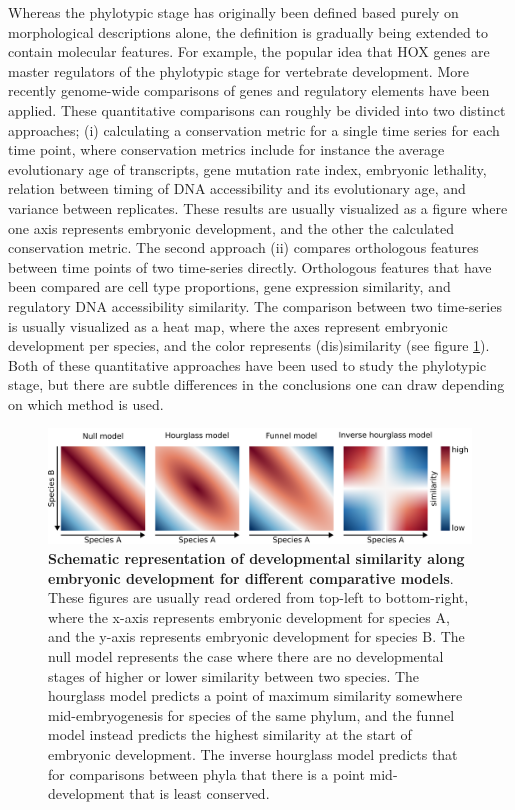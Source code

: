 Whereas the phylotypic stage has originally been defined based purely on morphological descriptions alone, the definition is gradually being extended to contain molecular features. For example, the popular idea that HOX genes are master regulators of the phylotypic stage for vertebrate development\cite{Duboule1994}. More recently genome-wide comparisons of genes and regulatory elements have been applied. These quantitative comparisons can roughly be divided into two distinct approaches; (i) calculating a conservation metric for a single time series for each time point, where conservation metrics include for instance the average evolutionary age of transcripts\cite{DomazetLoso2010}, gene mutation rate index\cite{Quint2012, Piasecka2013}, embryonic lethality\cite{Uchida2018}, relation between timing of DNA accessibility and its evolutionary age\cite{Uesaka2019}, and variance between replicates\cite{Liu2020, Uchida2022}. These results are usually visualized as a figure where one axis represents embryonic development, and the other the calculated conservation metric. The second approach (ii) compares orthologous features between time points of two time-series directly. Orthologous features that have been compared are cell type proportions\cite{Mayshar2023}, gene expression similarity\cite{Irie2011, Kalinka2010, Levin2016, marletaz2018}, and regulatory DNA accessibility similarity\cite{Hu2017, Liu2021}. The comparison between two time-series is usually visualized as a heat map, where the axes represent embryonic development per species, and the color represents (dis)similarity (see figure \ref{fig:models}). Both of these quantitative approaches have been used to study the phylotypic stage, but there are subtle differences in the conclusions one can draw depending on which method is used. 

\begin{figure}[H]
    \includegraphics[width=\linewidth]{ch.hourglass/images/models.png}
    \caption{\textbf{Schematic representation of developmental similarity along embryonic development for different comparative models}. These figures are usually read ordered from top-left to bottom-right, where the x-axis represents embryonic development for species A, and the y-axis represents embryonic development for species B. The null model represents the case where there are no developmental stages of higher or lower similarity between two species. The hourglass model predicts a point of maximum similarity somewhere mid-embryogenesis for species of the same phylum, and the funnel model instead predicts the highest similarity at the start of embryonic development. The inverse hourglass model predicts that for comparisons between phyla that there is a point mid-development that is least conserved.}
    \label{fig:models}
\end{figure}

